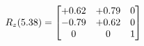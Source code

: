 \documentclass[preview]{standalone}
\begin{document}
\begin{align*}
\special{dvisvgm:raw <g id='unique000'>}R_{z}(5.38) = \begin{bmatrix}+0.62 & +0.79 & 0 \\-0.79 & +0.62 & 0 \\0 & 0 & 1\end{bmatrix}\special{dvisvgm:raw </g>}
\end{align*}
\end{document}
